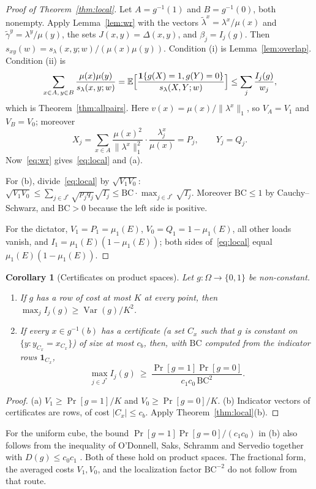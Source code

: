 \documentclass[11pt]{article}
\numberwithin{equation}{section}
\newtheorem{corollary}[theorem]{Corollary}
\theoremstyle{definition}
\theoremstyle{remark}
\newcommand{\E}{\mathbb{E}}
\newcommand{\1}{\mathbf 1}
\newcommand{\Var}{\operatorname{Var}}
\newcommand{\nrm}[1]{\lVert #1\rVert_1}
\begin{document}
\begin{proof}[Proof of Theorem~\ref{thm:local}]
Let $A=g^{-1}(1)$ and $B=g^{-1}(0)$, both nonempty. Apply Lemma~\ref{lem:wr} with the vectors $\tilde\lambda^x=\lambda^x/\mu(x)$ and $\tilde\gamma^y=\lambda^y/\mu(y)$, the sets $J(x,y)=\Delta(x,y)$, and $\beta_j=I_j(g)$. Then $s_{xy}(w)=s_\lambda(x,y;w)/(\mu(x)\mu(y))$. Condition (i) is Lemma~\ref{lem:overlap}. Condition (ii) is
\[
\sum_{x\in A,\,y\in B}\frac{\mu(x)\mu(y)}{s_\lambda(x,y;w)}=\E\Bigl[\frac{\1\{g(X)=1,g(Y)=0\}}{s_\lambda(X,Y;w)}\Bigr]\le\sum_j\frac{I_j(g)}{w_j},
\]
which is Theorem~\ref{thm:allpairs}. Here $v(x)=\mu(x)/\nrm{\lambda^x}$, so $V_A=V_1$ and $V_B=V_0$; moreover
\[X_j=\sum_{x\in A}\frac{\mu(x)^2}{\nrm{\lambda^x}^{2}}\cdot\frac{\lambda^x_j}{\mu(x)}=P_j,\qquad Y_j=Q_j.\] Now~\eqref{eq:wr} gives~\eqref{eq:local} and (a).

For (b), divide~\eqref{eq:local} by $\sqrt{V_1V_0}$: $\sqrt{V_1V_0}\le\sum_{j\in J^*}\sqrt{p_jq_j}\sqrt{I_j}\le\mathrm{BC}\cdot\max_{j\in J^*}\sqrt{I_j}$. Moreover $\mathrm{BC}\le1$ by Cauchy--Schwarz, and $\mathrm{BC}>0$ because the left side is positive.

For the dictator, $V_1=P_1=\mu_1(E)$, $V_0=Q_1=1-\mu_1(E)$, all other loads vanish, and $I_1=\mu_1(E)(1-\mu_1(E))$; both sides of~\eqref{eq:local} equal $\mu_1(E)(1-\mu_1(E))$.
\end{proof}

\begin{corollary}[Certificates on product spaces]\label{cor:cert}
Let $g:\Omega\to\{0,1\}$ be non-constant.
\begin{enumerate}[label=(\alph*),itemsep=1pt]
\item If $g$ has a row of cost at most $K$ at every point, then $\max_jI_j(g)\ge\Var(g)/K^2$.
\item If every $x\in g^{-1}(b)$ has a certificate (a set $C_x$ such that $g$ is constant on $\{y:y_{C_x}=x_{C_x}\}$) of size at most $c_b$, then, with $\mathrm{BC}$ computed from the indicator rows $\1_{C_x}$,
\[
\max_{j\in J^*}I_j(g)\ \ge\ \frac{\Pr[g=1]\Pr[g=0]}{c_1c_0\,\mathrm{BC}^2}.
\]
\end{enumerate}
\end{corollary}
\begin{proof}
(a) $V_1\ge\Pr[g=1]/K$ and $V_0\ge\Pr[g=0]/K$. (b) Indicator vectors of certificates are rows, of cost $|C_x|\le c_b$. Apply Theorem~\ref{thm:local}(b).
\end{proof}

For the uniform cube, the bound $\Pr[g=1]\Pr[g=0]/(c_1c_0)$ in (b) also follows from the inequality of O'Donnell, Saks, Schramm and Servedio together with $D(g)\le c_0c_1$ \cite{OSSS05,Tur26}. Both of these hold on product spaces. The fractional form, the averaged costs $V_1,V_0$, and the localization factor $\mathrm{BC}^{-2}$ do not follow from that route.
\end{document}
